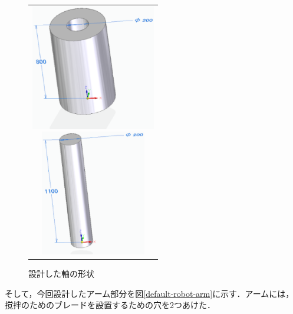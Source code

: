 \begin{figure}[htbp]
  \begin{center}
    \begin{tabular}{c}
          \begin{minipage}{0.50\hsize}
        \begin{center}
        \includegraphics[height=5.5cm]{img/eps/default-base.eps}
        \caption{設計した土台の形状}
        \label{default-base}
        \end{center}
      \end{minipage}
      \begin{minipage}{0.50\hsize}
        \begin{center}
          \includegraphics[height=5.5cm]{img/eps/default-shaft.eps}
          \caption{設計した軸の形状}
          \label{default-shaft}
        \end{center}
      \end{minipage}
    \end{tabular}
  \end{center}
\end{figure}

そして，今回設計したアーム部分を図\ref{default-robot-arm}に示す．アームには，撹拌のためのブレードを設置するための穴を2つあけた．

